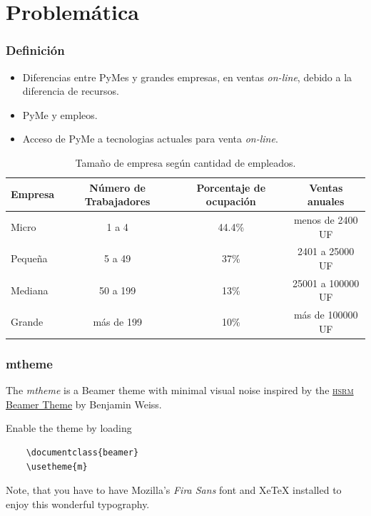 \documentclass[10pt, compress]{beamer}
\begin{document}
\section{Problemática}
\begin{frame}
\frametitle{Definición}
        \begin{itemize}[<+- | alert@+>]
          \item Diferencias entre PyMes y grandes empresas, en ventas \emph{on-line}, debido a la diferencia de recursos.
	  \item PyMe y empleos.
	  \item Acceso de PyMe a tecnologias actuales para venta \emph{on-line}.
        \end{itemize}

\begin{table}[h]
\footnotesize
\centering
\begin{tabular}{|l|c|c|c|}
\hline
{\bf Empresa}  & {\bf Número de Trabajadores} & {\bf Porcentaje de ocupación} & {\bf Ventas anuales}\\
\hline
Micro    & 1 a 4                & 44.4\%  & menos de 2400 UF\\
\hline
Pequeña  & 5 a 49               & 37\%  & 2401 a 25000 UF\\
\hline
Mediana  & 50 a 199             & 13\%  & 25001 a 100000 UF\\
\hline
Grande   & más de 199           & 10\%  & más de 100000 UF\\
\hline
\end{tabular}
\caption{Tamaño de empresa según cantidad de empleados.}
\label{tab:tam_empresa}
\end{table}
\end{frame}


\begin{frame}[fragile]
  \frametitle{mtheme}

  The \emph{mtheme} is a Beamer theme with minimal visual noise inspired by the
  \href{https://github.com/hsrmbeamertheme/hsrmbeamertheme}{\textsc{hsrm} Beamer
  Theme} by Benjamin Weiss.

  Enable the theme by loading

  \begin{verbatim}
    \documentclass{beamer}
    \usetheme{m}
  \end{verbatim}

  Note, that you have to have Mozilla's \emph{Fira Sans} font and XeTeX
  installed to enjoy this wonderful typography.
\end{frame}
\end{document}
